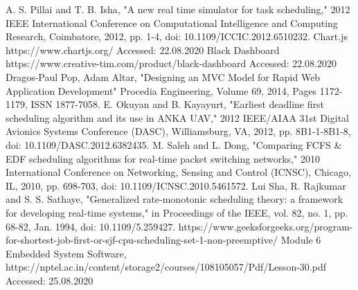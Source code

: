 \documentclass[12pt, conference]{IEEEtran}
\begin{document}
\begin{thebibliography}{00}
 A. S. Pillai and T. B. Isha, "A new real time simulator for task scheduling," 2012 IEEE International Conference on Computational Intelligence and Computing Research, Coimbatore, 2012, pp. 1-4, doi: 10.1109/ICCIC.2012.6510232.
 Chart.js https://www.chartjs.org/ Accessed: 22.08.2020
 Black Dashboard https://www.creative-tim.com/product/black-dashboard Accessed: 22.08.2020
 Dragos-Paul Pop, Adam Altar, "Designing an MVC Model for Rapid Web Application Development" Procedia Engineering, Volume 69, 2014, Pages 1172-1179, ISSN 1877-7058.
E. Okuyan and B. Kayayurt, "Earliest deadline first scheduling algorithm and its use in ANKA UAV," 2012 IEEE/AIAA 31st Digital Avionics Systems Conference (DASC), Williamsburg, VA, 2012, pp. 8B1-1-8B1-8, doi: 10.1109/DASC.2012.6382435.
M. Saleh and L. Dong, "Comparing FCFS \& EDF scheduling algorithms for real-time packet switching networks," 2010 International Conference on Networking, Sensing and Control (ICNSC), Chicago, IL, 2010, pp. 698-703, doi: 10.1109/ICNSC.2010.5461572.
 Lui Sha, R. Rajkumar and S. S. Sathaye, "Generalized rate-monotonic scheduling theory: a framework for developing real-time systems," in Proceedings of the IEEE, vol. 82, no. 1, pp. 68-82, Jan. 1994, doi: 10.1109/5.259427.
 https://www.geeksforgeeks.org/program-for-shortest-job-first-or-sjf-cpu-scheduling-set-1-non-preemptive/
 Module 6 Embedded System Software, https://nptel.ac.in/content/storage2/courses/108105057/Pdf/Lesson-30.pdf Accessed: 25.08.2020
\end{thebibliography}
\vspace{12pt}
\end{document}
